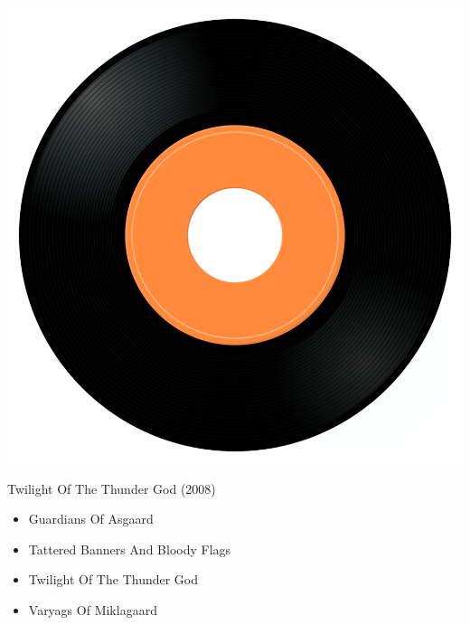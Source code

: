 \begin{minipage}[t]{0.25\textwidth}\vspace{0pt}
\captionsetup{type=figure}
\includegraphics[width=\textwidth]{Images/cover.png}
\caption*{Twilight Of The Thunder God (2008)}
\end{minipage}
\begin{minipage}[t]{0.25\textwidth}\vspace{0pt}
\begin{itemize}[nosep,leftmargin=1em,labelwidth=*,align=left]
	\setlength{\itemsep}{0pt}
	\item Guardians Of Asgaard
	\item Tattered Banners And Bloody Flags
	\item Twilight Of The Thunder God
	\item Varyags Of Miklagaard
\end{itemize}
\end{minipage}
